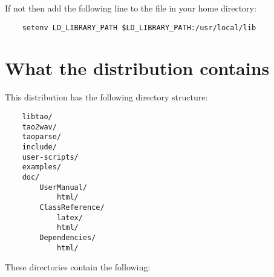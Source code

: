If not then add the following line to the  file in
your home directory:

\begin{verbatim}
    setenv LD_LIBRARY_PATH $LD_LIBRARY_PATH:/usr/local/lib
\end{verbatim}

\section{What the distribution contains}
This distribution has the following directory structure:

\begin{verbatim}
    libtao/
    tao2wav/
    taoparse/
    include/
    user-scripts/
    examples/
    doc/
        UserManual/
            html/
        ClassReference/
            latex/
            html/
        Dependencies/
            html/
\end{verbatim}

These directories contain the following:

